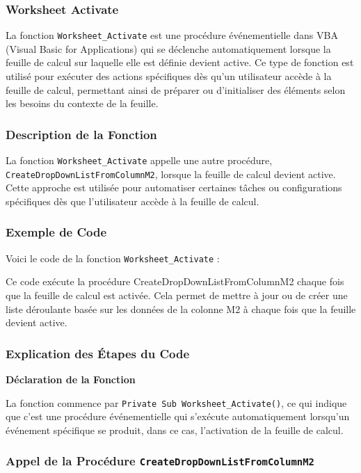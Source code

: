 \documentclass[a4paper, oneside, 12pt, final]{extreport}
\begin{document}
\subsubsection{Worksheet Activate}

La fonction \texttt{Worksheet\_Activate} est une procédure événementielle dans VBA (Visual Basic for Applications) qui se déclenche automatiquement lorsque la feuille de calcul sur laquelle elle est définie devient active. Ce type de fonction est utilisé pour exécuter des actions spécifiques dès qu'un utilisateur accède à la feuille de calcul, permettant ainsi de préparer ou d'initialiser des éléments selon les besoins du contexte de la feuille.

\subsubsection{Description de la Fonction}

La fonction \texttt{Worksheet\_Activate} appelle une autre procédure, \texttt{CreateDropDownListFromColumnM2}, lorsque la feuille de calcul devient active. Cette approche est utilisée pour automatiser certaines tâches ou configurations spécifiques dès que l'utilisateur accède à la feuille de calcul.

\subsubsection{Exemple de Code}

Voici le code de la fonction \texttt{Worksheet\_Activate} :

Ce code exécute la procédure CreateDropDownListFromColumnM2 chaque fois que la feuille de calcul est activée. Cela permet de mettre à jour ou de créer une liste déroulante basée sur les données de la colonne M2 à chaque fois que la feuille devient active.
\subsubsection{Explication des Étapes du Code}

\textbf{Déclaration de la Fonction}

La fonction commence par \texttt{Private Sub Worksheet\_Activate()}, ce qui indique que c'est une procédure événementielle qui s'exécute automatiquement lorsqu'un événement spécifique se produit, dans ce cas, l'activation de la feuille de calcul.

\subsubsection{Appel de la Procédure \texttt{CreateDropDownListFromColumnM2}}
\end{document}
